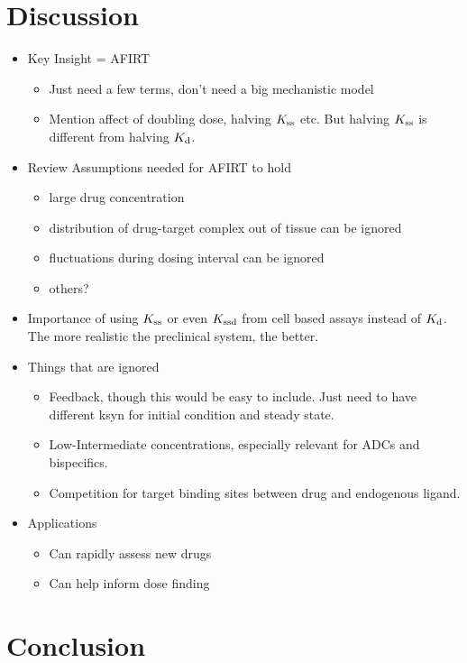 \section{Discussion}

\begin{itemize}
\item Key Insight = AFIRT
	\begin{itemize}
		\item Just need a few terms, don't need a big mechanistic model
		\item Mention affect of doubling dose, halving $K_\text{ss}$ etc.
			\subitem But halving $K_\text{ss}$ is different from halving $K_\text{d}$.
	\end{itemize}
\item Review Assumptions needed for AFIRT to hold
	\begin{itemize}
		\item large drug concentration
		\item distribution of drug-target complex out of tissue can be ignored
		\item fluctuations during dosing interval can be ignored
		\item others?
	\end{itemize}
\item Importance of using $K_\text{ss}$ or even $K_\text{ssd}$ from cell based assays instead of $K_\text{d}$.  The more realistic the preclinical system, the better.
\item Things that are ignored
	\begin{itemize}
		\item Feedback, though this would be easy to include.  Just need to have different ksyn for initial condition and steady state.
		\item Low-Intermediate concentrations, especially relevant for ADCs and bispecifics.
		\item Competition for target binding sites between drug and endogenous ligand.
	\end{itemize}
\item Applications
	\begin{itemize}
		\item Can rapidly assess new drugs
		\item Can help inform dose finding
	\end{itemize}
\end{itemize}

\section{Conclusion}